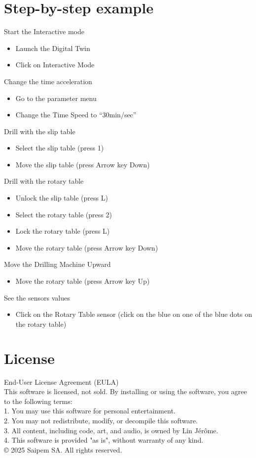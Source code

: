 \documentclass{article}
\begin{document}
\section{Step-by-step example}\hfill
\noindent Start the Interactive mode
\begin{itemize}
    \item Launch the Digital Twin
    \item Click on Interactive Mode
\end{itemize}
Change the time acceleration
\begin{itemize}
	\item Go to the parameter menu
	\item Change the Time Speed to “30min/sec”
\end{itemize}
Drill with the slip table
\begin{itemize}
    \item Select the slip table (press 1)
    \item Move the slip table (press Arrow key Down)
\end{itemize}
Drill with the rotary table
\begin{itemize}
    \item Unlock the slip table (press L)
    \item Select the rotary table (press 2)
    \item Lock the rotary table (press L)
    \item Move the rotary table (press Arrow key Down)
\end{itemize}
Move the Drilling Machine Upward
\begin{itemize}
    \item Move the rotary table (press Arrow key Up)
\end{itemize}
See the sensors values
\begin{itemize}
    \item Click on the Rotary Table sensor (click on the blue on one of the blue dots on the rotary table)
\end{itemize}





\section{License}
End-User License Agreement (EULA)\\
\newline
\noindent This software is licensed, not sold. By installing or using the software, you agree to the following terms:\\
1. You may use this software for personal entertainment.\\
2. You may not redistribute, modify, or decompile this software.\\
3. All content, including code, art, and audio, is owned by Lin Jérôme.\\
4. This software is provided "as is", without warranty of any kind.\\
\newline
\noindent © 2025 Saipem SA. All rights reserved.
\end{document}
